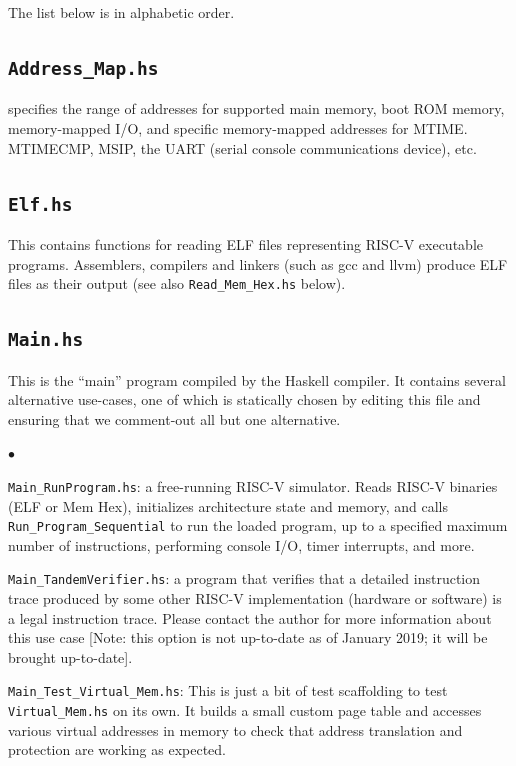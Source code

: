 \documentclass[11pt]{article}
\newenvironment{tightlist}%
{\begin{list}{$\bullet$}{%
    \setlength{\topsep}{0in}
    \setlength{\partopsep}{0in}
    \setlength{\itemsep}{0in}
    \setlength{\parsep}{0in}
    \setlength{\leftmargin}{1.5em}
    \setlength{\rightmargin}{0in}
    \setlength{\itemindent}{0in}
}
}%
{\end{list}
}
\begin{document}
The list below is in alphabetic order.


\subsection{\tt Address\_Map.hs}

specifies the range of addresses for supported main memory, boot ROM
memory, memory-mapped I/O, and specific memory-mapped addresses for
MTIME. MTIMECMP, MSIP, the UART (serial console communications
device), etc.


\subsection{\tt Elf.hs}

This contains functions for reading ELF files representing RISC-V
executable programs.  Assemblers, compilers and linkers (such as gcc
and llvm) produce ELF files as their output (see also
\verb|Read_Mem_Hex.hs| below).


\subsection{\tt Main.hs}

This is the ``main'' program compiled by the Haskell compiler.  It
contains several alternative use-cases, one of which is statically
chosen by editing this file and ensuring that we comment-out all but
one alternative.

\begin{tightlist}

\item \verb|Main_RunProgram.hs|: a free-running RISC-V simulator.
Reads RISC-V binaries (ELF or Mem Hex), initializes architecture state
and memory, and calls \verb|Run_Program_Sequential| to run the loaded
program, up to a specified maximum number of instructions, performing
console I/O, timer interrupts, and more.

\item \verb|Main_TandemVerifier.hs|: a program that verifies that a
detailed instruction trace produced by some other RISC-V
implementation (hardware or software) is a legal instruction trace.
Please contact the author for more information about this use case
[Note: this option is not up-to-date as of January 2019; it will be
brought up-to-date].

\item \verb|Main_Test_Virtual_Mem.hs|: This is just a bit of test
scaffolding to test \verb|Virtual_Mem.hs| on its own.  It builds a
small custom page table and accesses various virtual addresses in
memory to check that address translation and protection are working as
expected.

\end{tightlist}
\end{document}
